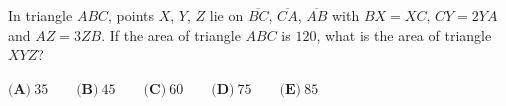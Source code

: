 In triangle $ABC$, points $X$, $Y$, $Z$ lie on $\overline{BC}$, $\overline{CA}$, $\overline{AB}$ with $BX=XC$, $CY=2YA$ and $AZ=3ZB$. If the area of triangle $ABC$ is $120$, what is the area of triangle $XYZ$?

$\textbf{(A)}\ 35\qquad\textbf{(B)}\ 45\qquad\textbf{(C)}\ 60\qquad\textbf{(D)}\ 75\qquad\textbf{(E)}\ 85$
